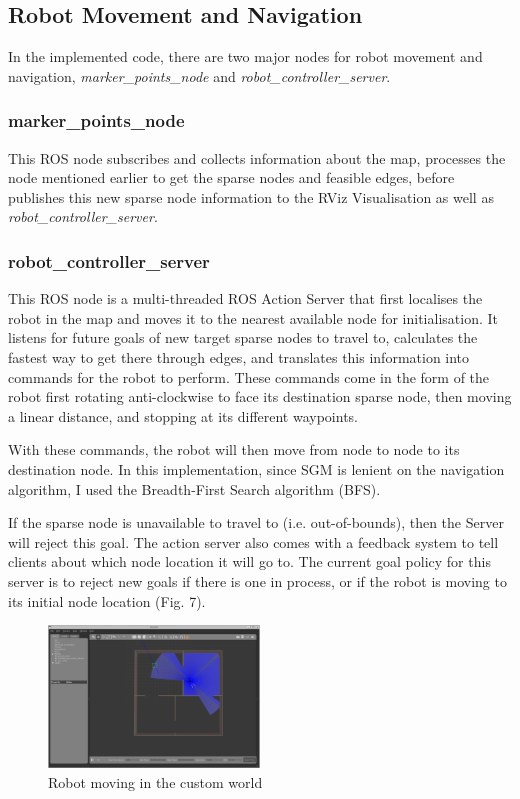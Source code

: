\documentclass[conference]{IEEEtran}
\begin{document}
\subsection{Robot Movement and Navigation}
In the implemented code, there are two major nodes for robot movement and navigation, \textit{marker\_points\_node} and \textit{robot\_controller\_server}.

\subsubsection{marker\_points\_node}
This ROS node subscribes and collects information about the map, processes the node mentioned earlier to get the sparse nodes and feasible edges, before publishes this new sparse node information to the RViz Visualisation as well as \textit{robot\_controller\_server}.

\subsubsection{robot\_controller\_server}
This ROS node is a multi-threaded ROS Action Server that first localises the robot in the map and moves it to the nearest available node for initialisation. It listens for future goals of new target sparse nodes to travel to, calculates the fastest way to get there through edges, and translates this information into commands for the robot to perform. These commands come in the form of the robot first rotating anti-clockwise to face its destination sparse node, then moving a linear distance, and stopping at its different waypoints.

With these commands, the robot will then move from node to node to its destination node. In this implementation, since SGM is lenient on the navigation algorithm, I used the Breadth-First Search algorithm (BFS).

If the sparse node is unavailable to travel to (i.e. out-of-bounds), then the Server will reject this goal. The action server also comes with a feedback system to tell clients about which node location it will go to. The current goal policy for this server is to reject new goals if there is one in process, or if the robot is moving to its initial node location (Fig. 7).

\begin{figure}[h]
  \centering
  \includegraphics[width=0.5\textwidth]{../assets/map_nav_2.png}
  \caption{Robot moving in the custom world}
  \label{fig:example}
\end{figure}
\end{document}
